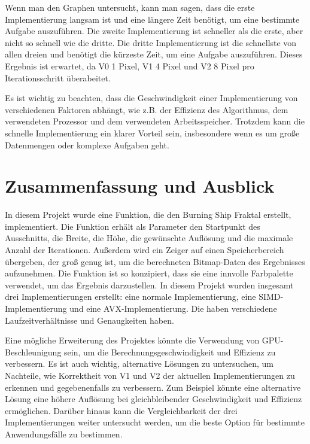 \documentclass[course=erap]{aspdoc}
\begin{document}
Wenn man den Graphen untersucht, kann man sagen, dass die erste Implementierung langsam ist und eine längere Zeit benötigt, um eine bestimmte Aufgabe auszuführen. Die zweite Implementierung ist schneller als die erste, aber nicht so schnell wie die dritte. Die dritte Implementierung ist die schnellste von allen dreien und benötigt die kürzeste Zeit, um eine Aufgabe auszuführen. Dieses Ergebnis ist erwartet, da V0 1 Pixel, V1 4 Pixel und V2 8 Pixel pro Iterationsschritt überabeitet.

Es ist wichtig zu beachten, dass die Geschwindigkeit einer Implementierung von verschiedenen Faktoren abhängt, wie z.B. der Effizienz des Algorithmus, dem verwendeten Prozessor und dem verwendeten Arbeitsspeicher. Trotzdem kann die schnelle Implementierung ein klarer Vorteil sein, insbesondere wenn es um große Datenmengen oder komplexe Aufgaben geht.

\section{Zusammenfassung und Ausblick}
In diesem Projekt wurde eine Funktion, die den Burning Ship Fraktal erstellt, implementiert. Die Funktion erhält als Parameter den Startpunkt des Ausschnitts, die Breite, die Höhe, die gewünschte Auflösung und die maximale Anzahl der Iterationen. Außerdem wird ein Zeiger auf einen Speicherbereich übergeben, der groß genug ist, um die berechneten Bitmap-Daten des Ergebnisses aufzunehmen. Die Funktion ist so konzipiert, dass sie eine innvolle Farbpalette verwendet, um das Ergebnis darzustellen. In diesem Projekt wurden insgesamt drei Implementierungen erstellt: eine normale Implementierung, eine SIMD-Implementierung und eine AVX-Implementierung. Die haben verschiedene Laufzeitverhältnisse und Genaugkeiten haben.

Eine mögliche Erweiterung des Projektes könnte die Verwendung von GPU-Beschleunigung sein, um die Berechnungsgeschwindigkeit und Effizienz zu verbessern. Es ist auch wichtig, alternative Lösungen zu untersuchen, um Nachteile, wie Korrektheit von V1 und V2 der aktuellen Implementierungen zu erkennen und gegebenenfalls zu verbessern. Zum Beispiel könnte eine alternative Lösung eine höhere Auflösung bei gleichbleibender Geschwindigkeit und Effizienz ermöglichen. Darüber hinaus kann die Vergleichbarkeit der drei Implementierungen weiter untersucht werden, um die beste Option für bestimmte Anwendungsfälle zu bestimmen.


{}
\end{document}
